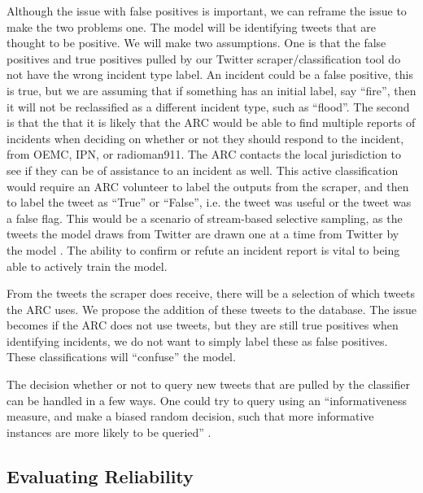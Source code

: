 \documentclass[titlepage, 12pt]{article}
\begin{document}
\hspace{0.5 cm}Although the issue with false positives is important, we can reframe the issue to make the two problems one. The model will be identifying tweets that are thought to be positive. We will make two assumptions. One is that the false positives and true positives pulled by our Twitter scraper/classification tool do not have the wrong incident type label. An incident could be a false positive, this is true, but we are assuming that if something has an initial label, say ``fire'', then it will not be reclassified as a different incident type, such as ``flood''. The second is that the  that it is likely that the ARC would be able to find multiple reports of incidents when deciding on whether or not they should respond to the incident, from OEMC, IPN, or radioman911. The ARC contacts the local jurisdiction to see if they can be of assistance to an incident as well. This active classification would require an ARC volunteer to label the outputs from the scraper, and then to label the tweet as ``True'' or ``False'', i.e. the tweet was useful or the tweet was a false flag. This would be a scenario of stream-based selective sampling, as the tweets the model draws from Twitter are drawn one at a time from Twitter by the model \citep{settles.tr09}. The ability to confirm or refute an incident report is vital to being able to actively train the model.

\hspace{0.5 cm}From the tweets the scraper does receive, there will be a selection of which tweets the ARC uses. We propose the addition of these tweets to the database. The issue becomes if the ARC does not use tweets, but they are still true positives when identifying incidents, we do not want to simply label these as false positives. These classifications will ``confuse'' the model.

\hspace{0.5 cm}The decision whether or not to query new tweets that are pulled by the classifier can be handled in a few ways. One could try to query using an ``informativeness measure, and make a biased random decision, such that more informative instances are more likely to be queried'' \citep{settles.tr09}.

\subsection{Evaluating Reliability}
\end{document}
